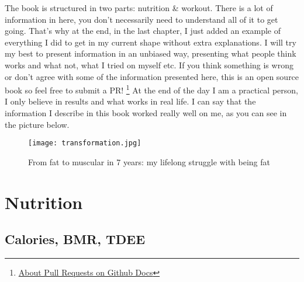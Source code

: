 \documentclass[openany, 12pt]{book}
\begin{document}
	The book is structured in two parts: nutrition \& workout. There is a lot of information in here, you don't necessarily need to understand all of it
	to get going. That's why at the end, in the last chapter, I just added an example of everything I did to get in my current shape without extra explanations. I will try 
	my best to present information in an unbiased way, presenting what people think works and what not, what I tried on myself etc. If you think 
	something is wrong or don't agree with some of the information presented here, this is an open source book so feel free to submit a PR!
        \footnote{\href{https://docs.github.com/en/free-pro-team@latest/github/collaborating-with-issues-and-pull-requests/about-pull-requests}
	{About Pull Requests on Github Docs}} At the end of the day I am a practical person, I only believe in results and what works in real life. 
	I can say that the information I describe in this book worked really well on me, as you can see in the picture below.
	
	\begin{figure}[h]
		\centering
		\texttt{[image: transformation.jpg]}
		\caption{From fat to muscular in 7 years: my lifelong struggle with being fat}
		\label{fig1}
	\end{figure}
	
	
  \chapter{Nutrition}
  
  	\section{Calories, BMR, TDEE}
  	
\end{document}
